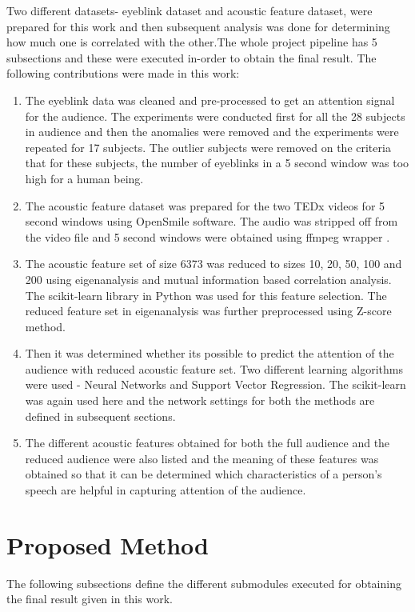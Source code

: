 Two different datasets- eyeblink dataset and acoustic feature dataset, were prepared for this work and then subsequent analysis was done for determining how much one is correlated with the other.The whole project pipeline has 5 subsections and these were executed in-order to obtain the final result. The following contributions were made in this work:
\begin{enumerate}
\item The eyeblink data was cleaned and pre-processed to get an attention signal for the audience. The experiments were conducted first for all the 28 subjects in audience and then the anomalies were removed and the experiments were repeated for 17 subjects. The outlier subjects were removed on the criteria that for these subjects, the number of eyeblinks in a 5 second window was too high for a human being.
\item The acoustic feature dataset was prepared for the two TEDx videos for 5 second windows using OpenSmile software. The audio was stripped off from the video file and 5 second windows were obtained using ffmpeg wrapper \cite{ffmpeg}. 
\item The acoustic feature set of size 6373 was reduced to sizes 10, 20, 50, 100 and 200 using eigenanalysis and mutual information based correlation analysis. The scikit-learn library in Python \cite{scikit} was used for this feature selection. The reduced feature set in eigenanalysis was further preprocessed using Z-score method.
\item Then it was determined whether its possible to predict the attention of the audience with reduced acoustic feature set. Two different learning algorithms were used - Neural Networks and Support Vector Regression. The scikit-learn was again used here and the network settings for both the methods are defined in subsequent sections.
\item The different acoustic features obtained for both the full audience and the reduced audience were also listed and the meaning of these features was obtained so that it can be determined which characteristics of a person's speech are helpful in capturing attention of the audience.  
\end{enumerate}

\section{Proposed Method}
\label{sec:methods}

The following subsections define the different submodules executed for obtaining the final result given in this work. 

